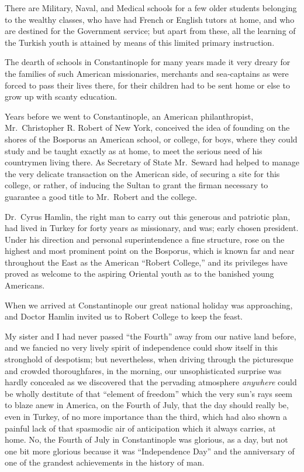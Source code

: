 \documentclass[12pt]{book}
\begin{document}
There are Military, Naval, and Medical schools for a few older students belonging to the wealthy classes, who have had French or English tutors at home, and
who are destined for the Government service; but apart from these, all the learning
of the Turkish youth is attained by means of this limited primary instruction.

The dearth of schools in Constantinople for many years made it very dreary
for the families of such American missionaries, merchants and sea‐captains as
were forced to pass their lives there, for their children had to be sent home or else
to grow up with scanty education.

Years before we went to Constantinople, an American philanthropist, Mr.~Christopher
R. Robert of New York, conceived the idea of founding on the shores
of the Bosporus an American school, or college, for boys, where they could study
and be taught exactly as at home, to meet the serious need of his countrymen
living there. As Secretary of State Mr.~Seward had helped to manage the very
delicate transaction on the American side, of securing a site for this college, or
rather, of inducing the Sultan to grant the firman necessary to guarantee a good
title to Mr.~Robert and the college.

Dr.~Cyrus Hamlin, the right man to carry out this generous and patriotic
plan, had lived in Turkey for forty years as missionary, and was; early chosen
president. Under his direction and personal superintendence a fine structure, rose
on the highest and most prominent point on the Bosporus, which is known far
and near throughout the East as the American “Robert College,” and its privileges
have proved as welcome to the aspiring Oriental youth as to the banished young
Americans.

When we arrived at Constantinople our great national holiday was approaching, and Doctor Hamlin invited us to Robert College to keep the feast.

My sister and I had never passed “the Fourth” away from our native land
before, and we fancied no very lively spirit of independence could show itself
in this stronghold of despotism; but nevertheless, when driving through the
picturesque and crowded thoroughfares, in the morning, our unsophisticated
surprise was hardly concealed as we discovered that the pervading atmosphere
{\it anywhere} could be wholly destitute of that “element of freedom” which the very
sun’s rays seem to blaze anew in America, on the Fourth of July, that the day
should really be, even in Turkey, of no more importance than the third, which had
also shown a painful lack of that spasmodic air of anticipation which it always
carries, at home. No, the Fourth of July in Constantinople was glorious, as a
day, but not one bit more glorious because it was “Independence Day” and the
anniversary of one of the grandest achievements in the history of man.
\end{document}
